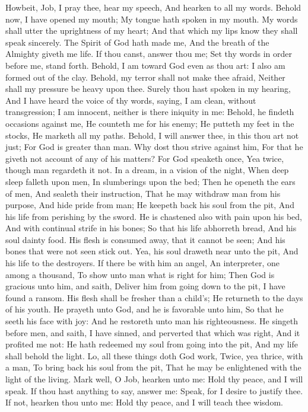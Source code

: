 Howbeit, Job, I pray thee, hear my speech, And hearken to all my words.  Behold now, I have opened my mouth; My tongue hath spoken in my mouth.  My words shall utter the uprightness of my heart; And that which my lips know they shall speak sincerely.  The Spirit of God hath made me, And the breath of the Almighty giveth me life.  If thou canst, answer thou me; Set thy words in order before me, stand forth.  Behold, I am toward God even as thou art: I also am formed out of the clay.  Behold, my terror shall not make thee afraid, Neither shall my pressure be heavy upon thee.  Surely thou hast spoken in my hearing, And I have heard the voice of thy words, saying,  I am clean, without transgression; I am innocent, neither is there iniquity in me:  Behold, he findeth occasions against me, He counteth me for his enemy;  He putteth my feet in the stocks, He marketh all my paths.  Behold, I will answer thee, in this thou art not just; For God is greater than man.  Why dost thou strive against him, For that he giveth not account of any of his matters?  For God speaketh once, Yea twice, though man regardeth it not.  In a dream, in a vision of the night, When deep sleep falleth upon men, In slumberings upon the bed;  Then he openeth the ears of men, And sealeth their instruction,  That he may withdraw man from his purpose, And hide pride from man;  He keepeth back his soul from the pit, And his life from perishing by the sword.  He is chastened also with pain upon his bed, And with continual strife in his bones;  So that his life abhorreth bread, And his soul dainty food.  His flesh is consumed away, that it cannot be seen; And his bones that were not seen stick out.  Yea, his soul draweth near unto the pit, And his life to the destroyers.  If there be with him an angel, An interpreter, one among a thousand, To show unto man what is right for him;  Then God is gracious unto him, and saith, Deliver him from going down to the pit, I have found a ransom.  His flesh shall be fresher than a child’s; He returneth to the days of his youth.  He prayeth unto God, and he is favorable unto him, So that he seeth his face with joy: And he restoreth unto man his righteousness.  He singeth before men, and saith, I have sinned, and perverted that which was right, And it profited me not:  He hath redeemed my soul from going into the pit, And my life shall behold the light.  Lo, all these things doth God work, Twice, yea thrice, with a man,  To bring back his soul from the pit, That he may be enlightened with the light of the living.  Mark well, O Job, hearken unto me: Hold thy peace, and I will speak.  If thou hast anything to say, answer me: Speak, for I desire to justify thee.  If not, hearken thou unto me: Hold thy peace, and I will teach thee wisdom. 


